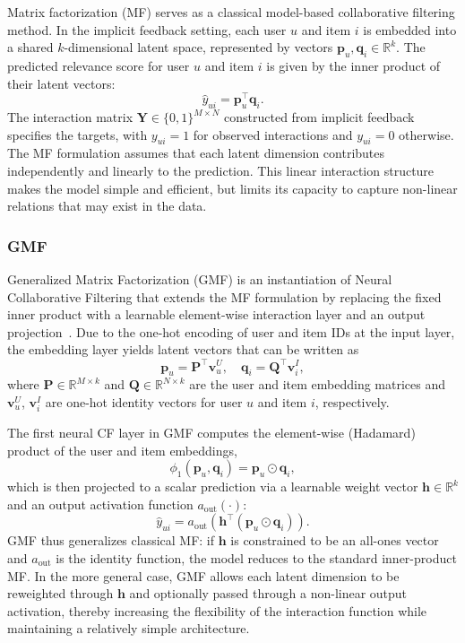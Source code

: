 \documentclass[11pt]{article}
\begin{document}
Matrix factorization (MF) serves as a classical model-based collaborative filtering method. In the implicit feedback setting, each user $u$ and item $i$ is embedded into a shared $k$-dimensional latent space, represented by vectors $\mathbf{p}_u, \mathbf{q}_i \in \mathbb{R}^k$. The predicted relevance score for user $u$ and item $i$ is given by the inner product of their latent vectors:
\[
    \hat{y}_{ui} = \mathbf{p}_u^\top \mathbf{q}_i.
\]
The interaction matrix $\mathbf{Y} \in \{0,1\}^{M \times N}$ constructed from implicit feedback specifies the targets, with $y_{ui} = 1$ for observed interactions and $y_{ui} = 0$ otherwise. The MF formulation assumes that each latent dimension contributes independently and linearly to the prediction. This linear interaction structure makes the model simple and efficient, but limits its capacity to capture non-linear relations that may exist in the data.


\subsubsection{GMF}

Generalized Matrix Factorization (GMF) is an instantiation of Neural Collaborative Filtering that extends the MF formulation by replacing the fixed inner product with a learnable element-wise interaction layer and an output projection~\cite{he2017neural}. Due to the one-hot encoding of user and item IDs at the input layer, the embedding layer yields latent vectors that can be written as
\[
    \mathbf{p}_u = \mathbf{P}^\top \mathbf{v}_u^{U}, \quad
    \mathbf{q}_i = \mathbf{Q}^\top \mathbf{v}_i^{I},
\]
where $\mathbf{P} \in \mathbb{R}^{M \times k}$ and $\mathbf{Q} \in \mathbb{R}^{N \times k}$ are the user and item embedding matrices and $\mathbf{v}_u^{U}$, $\mathbf{v}_i^{I}$ are one-hot identity vectors for user $u$ and item $i$, respectively.

The first neural CF layer in GMF computes the element-wise (Hadamard) product of the user and item embeddings,
\[
    \phi_{1}\left(\mathbf{p}_u, \mathbf{q}_i\right) = \mathbf{p}_u \odot \mathbf{q}_i,
\]
which is then projected to a scalar prediction via a learnable weight vector $\mathbf{h} \in \mathbb{R}^k$ and an output activation function $a_{\text{out}}(\cdot)$:
\[
    \hat{y}_{ui} = a_{\text{out}}\!\left(\mathbf{h}^\top \left(\mathbf{p}_u \odot \mathbf{q}_i\right)\right).
\]
GMF thus generalizes classical MF: if $\mathbf{h}$ is constrained to be an all-ones vector and $a_{\text{out}}$ is the identity function, the model reduces to the standard inner-product MF. In the more general case, GMF allows each latent dimension to be reweighted through $\mathbf{h}$ and optionally passed through a non-linear output activation, thereby increasing the flexibility of the interaction function while maintaining a relatively simple architecture.
\end{document}
